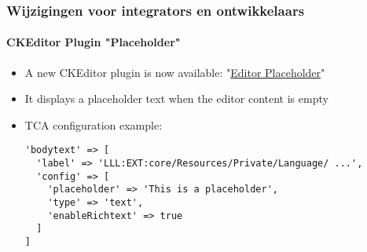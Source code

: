 %

\begin{frame}[fragile]
	\frametitle{Wijzigingen voor integrators en ontwikkelaars}
	\framesubtitle{CKEditor Plugin "Placeholder"}

	\lstset{basicstyle=\tiny\ttfamily}

	\begin{itemize}
		\item A new CKEditor plugin is now available:
			"\href{https://ckeditor.com/docs/ckeditor4/latest/examples/editorplaceholder.html}{Editor Placeholder}"
		\item It displays a placeholder text when the editor content is empty
		\item TCA configuration example:
\begin{lstlisting}
'bodytext' => [
  'label' => 'LLL:EXT:core/Resources/Private/Language/ ...',
  'config' => [
    'placeholder' => 'This is a placeholder',
    'type' => 'text',
    'enableRichtext' => true
  ]
]
\end{lstlisting}

	\end{itemize}

\end{frame}

